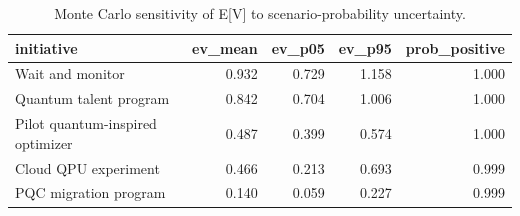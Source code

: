 \begin{table}
\caption{Monte Carlo sensitivity of E[V] to scenario-probability uncertainty.}
\label{tab:sens}
\begin{tabular}{lrrrr}
\toprule
initiative & ev\_mean & ev\_p05 & ev\_p95 & prob\_positive \\
\midrule
Wait and monitor & 0.932 & 0.729 & 1.158 & 1.000 \\
Quantum talent program & 0.842 & 0.704 & 1.006 & 1.000 \\
Pilot quantum-inspired optimizer & 0.487 & 0.399 & 0.574 & 1.000 \\
Cloud QPU experiment & 0.466 & 0.213 & 0.693 & 0.999 \\
PQC migration program & 0.140 & 0.059 & 0.227 & 0.999 \\
\bottomrule
\end{tabular}
\end{table}
